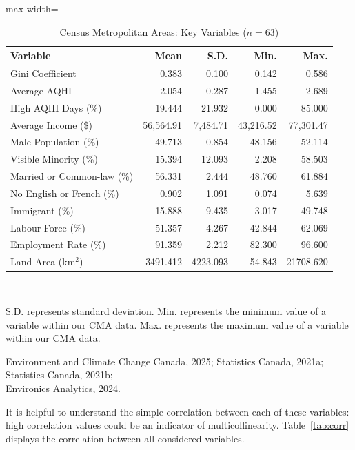 \documentclass[AEJ]{AEA}
\begin{document}
\begin{table}[htbp]\centering
\caption{Census Metropolitan Areas: Key Variables ($n = 63$)}
\label{tab:summary}
\begin{adjustbox}{max width=\textwidth}
\begin{tabular}{lrrrr}
\toprule
\textbf{Variable} & \textbf{Mean} & \textbf{S.D.} & \textbf{Min.} & \textbf{Max.} \\
\midrule
Gini Coefficient & 0.383 & 0.100 & 0.142 & 0.586 \\
Average AQHI & 2.054 & 0.287 & 1.455 & 2.689 \\
High AQHI Days (\%) & 19.444 & 21.932 & 0.000 & 85.000 \\
Average Income (\$) & 56,564.91 & 7,484.71 & 43,216.52 & 77,301.47 \\
Male Population (\%) & 49.713 & 0.854 & 48.156 & 52.114 \\
Visible Minority (\%) & 15.394 & 12.093 & 2.208 & 58.503 \\
Married or Common-law (\%) & 56.331 & 2.444 & 48.760 & 61.884 \\
No English or French (\%) & 0.902 & 1.091 & 0.074 & 5.639 \\
Immigrant (\%) & 15.888 & 9.435 & 3.017 & 49.748 \\
Labour Force (\%) & 51.357 & 4.267 & 42.844 & 62.069 \\
Employment Rate (\%) & 91.359 & 2.212 & 82.300 & 96.600 \\
Land Area (km$^2$) & 3491.412 & 4223.093 & 54.843 & 21708.620 \\
\bottomrule
\end{tabular}
\end{adjustbox}
\\[1ex]
\begin{tablenotes}
S.D. represents standard deviation. Min. represents the minimum value of a variable
within our CMA data. Max. represents the maximum value of a variable within our CMA data.
\end{tablenotes}
\begin{tablenotes}[Source]
Environment and Climate Change Canada, 2025; Statistics Canada, 2021a;
Statistics Canada, 2021b; \\Environics Analytics, 2024.
\end{tablenotes}
\end{table}

It is helpful to understand the simple correlation between each of these variables:
high correlation values could be an indicator of multicollinearity.
Table~\ref{tab:corr} displays the correlation between all considered variables.
\end{document}
